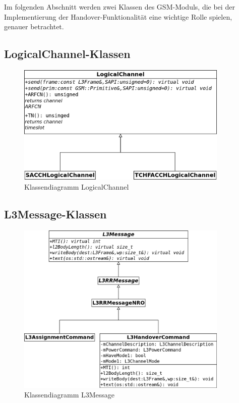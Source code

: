 Im folgenden Abschnitt werden zwei Klassen des GSM-Moduls, die bei der Implementierung der Handover-Funktionalität eine wichtige Rolle spielen, genauer betrachtet.

\subsection{LogicalChannel-Klassen}

\begin{figure}[h!]
  \centering
  \includegraphics[width=0.9\textwidth]{img/lc}
  \caption{Klassendiagramm LogicalChannel}
  \label{fig:logchan}
\end{figure}

\subsection{L3Message-Klassen}

\begin{figure}[h!]
  \centering
  \includegraphics[width=0.9\textwidth]{img/l3m}
  \caption{Klassendiagramm L3Message}
  \label{fig:l3mess}
\end{figure}
